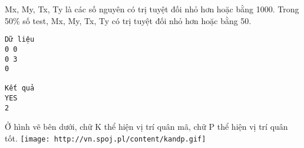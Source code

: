 Mx, My, Tx, Ty là các số nguyên có trị tuyệt đối nhỏ hơn hoặc bằng 1000. Trong 50\% số test, Mx, My, Tx, Ty có trị tuyệt đối nhỏ hơn hoặc bằng 50.
\begin{verbatim}
Dữ liệu
0 0
0 3
0

Kết quả
YES
2
\end{verbatim}
Ở hình vẽ bên dưới, chữ K thể hiện vị trí quân mã, chữ P thể hiện vị trí quân tốt.  
\texttt{[image: http://vn.spoj.pl/content/kandp.gif]}